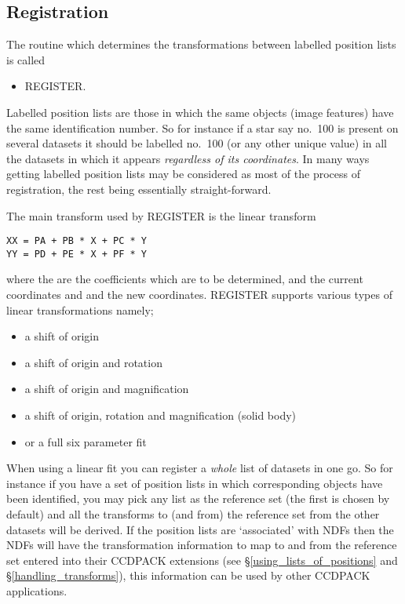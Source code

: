\subsection{Registration}

The routine which determines the transformations between labelled
position lists is called
\begin{itemize}
\item REGISTER.
\end{itemize}
Labelled position lists are those in which the same objects (image
features) have the same identification number. So for instance if a
star say no.\ 100 is present on several datasets it should be labelled
no.\ 100 (or any other unique value) in all the datasets in which it
appears {\em regardless of its coordinates}. In many ways getting
labelled position lists may be considered as most of the process of
registration, the rest being essentially straight-forward. 

The main transform used by REGISTER is the linear transform
\begin{myquote}
\begin{verbatim}
XX = PA + PB * X + PC * Y
YY = PD + PE * X + PF * Y 
\end{verbatim}
\end{myquote}
where the  are the coefficients which are to be
determined,  and  the current coordinates and
 and  the new coordinates. REGISTER supports
various types of linear transformations namely;
\begin{itemize}
\item a shift of origin
\item a shift of origin and rotation
\item a shift of origin and magnification
\item a shift of origin, rotation and magnification (solid body)
\item or a full six parameter fit
\end{itemize}

When using a linear fit you can register a {\em whole} list of datasets
in one go. So for instance if you have a set of position lists in which
corresponding objects have been identified, you may pick any list as the
reference set (the first is chosen by default) and all the transforms to
(and from) the reference set from the other datasets will be
derived. If the position lists are `associated' with NDFs then the
NDFs will have the transformation information to map to and from the
reference set entered into their CCDPACK extensions (see
\S\ref{using_lists_of_positions} and \S\ref{handling_transforms}), this
information can be used by other CCDPACK applications.

